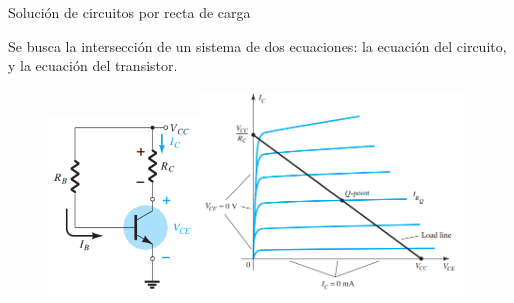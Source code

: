 \documentclass[t,aspectratio=169]{beamer}
\begin{document}
\begin{frame}{Solución de circuitos por recta de carga}

Se busca la intersección de un sistema de dos ecuaciones: la ecuación del circuito, y la ecuación del transistor.

\begin{figure}
    \centering
    \includegraphics[width=4cm]{figures/recta_de_carga_bjt_2.png}\hspace{1cm}\includegraphics[width=7cm]{figures/recta_de_carga_bjt.png}
\end{figure}

\end{frame}
\end{document}
